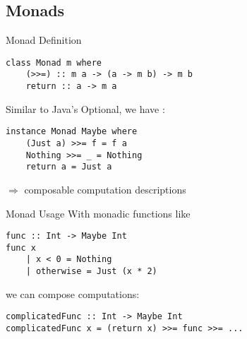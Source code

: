 \subsection{Monads}
\begin{frame}[fragile]{Monad Definition}
\begin{lstlisting}[frame=htrbl]
class Monad m where
	(>>=) :: m a -> (a -> m b) -> m b
	return :: a -> m a
\end{lstlisting}

Similar to Java's Optional, we have :
\begin{lstlisting}[frame=htrbl]
instance Monad Maybe where
	(Just a) >>= f = f a
	Nothing >>= _ = Nothing
	return a = Just a
\end{lstlisting}

$\Rightarrow$ composable computation descriptions

\end{frame}

\begin{frame}[fragile]{Monad Usage}
With monadic functions like
\begin{lstlisting}[frame=htrbl]
func :: Int -> Maybe Int
func x
	| x < 0 = Nothing
	| otherwise = Just (x * 2)
\end{lstlisting}
we can compose computations:
\begin{lstlisting}[frame=htrbl]
complicatedFunc :: Int -> Maybe Int
complicatedFunc x = (return x) >>= func >>= ...
\end{lstlisting}
\end{frame}